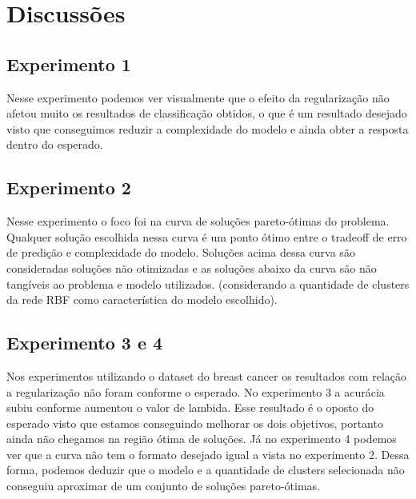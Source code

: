 \section{Discussões}

\subsection*{Experimento 1}

Nesse experimento podemos ver visualmente que o efeito da regularização não afetou muito os resultados de classificação obtidos, o que é um resultado desejado
visto que conseguimos reduzir a complexidade do modelo e ainda obter a resposta dentro do esperado.

\subsection*{Experimento 2}

Nesse experimento o foco foi na curva de soluções pareto-ótimas do problema. Qualquer solução escolhida nessa curva é um ponto ótimo entre o tradeoff de erro de predição e complexidade do modelo.
Soluções acima dessa curva são consideradas soluções não otimizadas e as soluções abaixo da curva são não tangíveis ao problema e modelo utilizados. (considerando a quantidade de clusters da rede RBF como característica do modelo escolhido).

\subsection*{Experimento 3 e 4}

Nos experimentos utilizando o dataset do breast cancer os resultados com relação a regularização não foram conforme o esperado. No experimento 3 a acurácia subiu conforme aumentou o valor de lambida. Esse resultado é o oposto do esperado visto que estamos conseguindo melhorar os dois objetivos, portanto ainda não
chegamos na região ótima de soluções. Já no experimento 4 podemos ver que a curva não tem o formato desejado igual a vista no experimento 2. Dessa forma, podemos deduzir que o modelo e a quantidade de clusters selecionada não conseguiu aproximar de um conjunto de soluções pareto-ótimas.